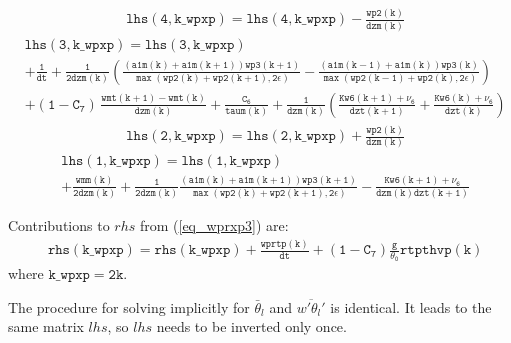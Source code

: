\documentclass[11pt,fleqn]{article}
\begin{document}
%
\begin{equation}
\begin{split}
&  \mathtt{ lhs(4,k\_wpxp) = lhs(4,k\_wpxp) -\frac{wp2(k)}{dzm(k)} }
\end{split}
\end{equation}
%
\begin{equation}
\begin{split}
&  \mathtt{ lhs(3,k\_wpxp) = lhs(3,k\_wpxp) } \\
&  \mathtt{
+ \frac{1}{dt}
+ \frac{1}{2 dzm(k)}
  \left( 
   \frac{\left(a1m(k)+a1m(k+1)\right) wp3(k+1)}
       {\max\left(wp2(k)+wp2(k+1),2\epsilon\right)}
  -\frac{\left(a1m(k-1)+a1m(k)\right) wp3(k)}
       {\max\left(wp2(k-1)+wp2(k),2\epsilon\right)}
  \right)
   } \\
&  \mathtt{
+ (1-C_7) \, \frac{wmt(k+1)-wmt(k)}{dzm(k)}
+ \frac{C_6}{taum(k)}
+ \frac{1}{dzm(k)} \left(   \frac{Kw6(k+1)+\nu_6}{dzt(k+1)} 
                          + \frac{Kw6(k)+\nu_6}{dzt(k)} \right)
   }
\end{split}
\end{equation}
%
\begin{equation}
\begin{split}
&  \mathtt{ lhs(2,k\_wpxp) = lhs(2,k\_wpxp) +\frac{wp2(k)}{dzm(k)} }
\end{split}
\end{equation}
%
\begin{equation}
\begin{split}
&  \mathtt{ lhs(1,k\_wpxp) = lhs(1,k\_wpxp) } \\
&  \mathtt{
+ \frac{wmm(k)}{2 dzm(k)}
+ \frac{1}{2 dzm(k)}
  \frac{\left(a1m(k)+a1m(k+1)\right) wp3(k+1)}
       {\max\left(wp2(k)+wp2(k+1),2\epsilon\right)}
- \frac{Kw6(k+1)+\nu_6}{dzm(k)dzt(k+1)}
  }
\end{split}
\end{equation}

Contributions to $rhs$ from (\ref{eq_wprxp3}) are:
%
\begin{equation}
\begin{split}
& \mathtt{
  rhs(k\_wpxp) 
= rhs(k\_wpxp) 
+ \frac{wprtp(k)}{dt} 
+ (1-C_7) \frac{g}{\theta_0} rtpthvp(k) }
\end{split}
\end{equation}
%
where $\mathtt{k\_wpxp = 2 k}$.

The procedure for solving implicitly for $\bar{\theta}_l$ 
and $\overline{w'\theta_l'}$ is identical. It leads to the same matrix
$lhs$, so $lhs$ needs to be inverted only once.
\end{document}
